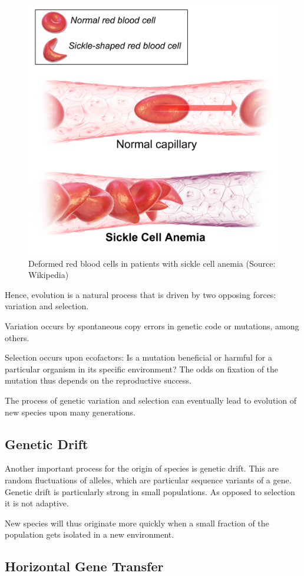 \documentclass[
  11pt,
]{book}
\begin{document}
\begin{figure}

{\centering \includegraphics[width=0.45\linewidth]{./figs/Sickle_Cell_Anemia_wiki3} 

}

\caption{Deformed red blood cells in patients with sickle cell anemia (Source: Wikipedia)}\label{fig:sickleCell2}
\end{figure}

Hence, evolution is a natural process that is driven by two opposing forces: variation and selection.

Variation occurs by spontaneous copy errors in genetic code or mutations, among others.

Selection occurs upon ecofactors: Is a mutation beneficial or harmful for a particular organism in its specific environment?
The odds on fixation of the mutation thus depends on the reproductive success.

The process of genetic variation and selection can eventually lead to evolution of new species upon many generations.

\hypertarget{genetic-drift}{%
\subsection{Genetic Drift}\label{genetic-drift}}

Another important process for the origin of species is genetic drift. This are random fluctuations of alleles, which are particular sequence variants of a gene. Genetic drift is particularly strong in small populations. As opposed to selection it is not adaptive.

New species will thus originate more quickly when a small fraction of the population gets isolated in a new environment.

\hypertarget{horizontal-gene-transfer}{%
\subsection{Horizontal Gene Transfer}\label{horizontal-gene-transfer}}
\end{document}
